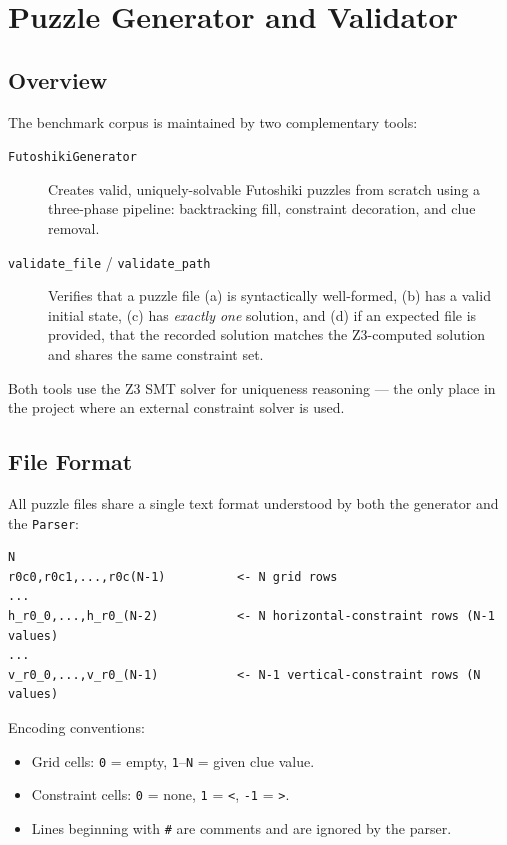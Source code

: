 \section{Puzzle Generator and Validator}
\label{sec:generator_validator}

\subsection{Overview}

The benchmark corpus is maintained by two complementary tools:

\begin{description}
  \item[\texttt{FutoshikiGenerator}] Creates valid, uniquely-solvable Futoshiki
    puzzles from scratch using a three-phase pipeline: backtracking fill,
    constraint decoration, and clue removal.
  \item[\texttt{validate\_file} / \texttt{validate\_path}] Verifies that a
    puzzle file (a) is syntactically well-formed, (b) has a valid initial
    state, (c) has \emph{exactly one} solution, and (d) if an expected file is
    provided, that the recorded solution matches the Z3-computed solution and
    shares the same constraint set.
\end{description}

Both tools use the Z3 SMT solver for uniqueness reasoning — the only place in
the project where an external constraint solver is used.

\subsection{File Format}
\label{sec:file_format}

All puzzle files share a single text format understood by both the generator
and the \texttt{Parser}:

\begin{verbatim}
N
r0c0,r0c1,...,r0c(N-1)          <- N grid rows
...
h_r0_0,...,h_r0_(N-2)           <- N horizontal-constraint rows (N-1 values)
...
v_r0_0,...,v_r0_(N-1)           <- N-1 vertical-constraint rows (N values)
\end{verbatim}

Encoding conventions:
\begin{itemize}
  \item Grid cells: \texttt{0} = empty, \texttt{1}--\texttt{N} = given clue value.
  \item Constraint cells: \texttt{0} = none, \texttt{1} = \texttt{<},
        \texttt{-1} = \texttt{>}.
  \item Lines beginning with \texttt{\#} are comments and are ignored by the
        parser.
\end{itemize}

